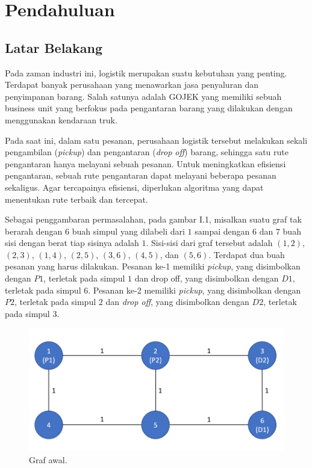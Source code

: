 \chapter{Pendahuluan}

\section{Latar Belakang}

Pada zaman industri ini, logistik merupakan suatu kebutuhan yang penting. Terdapat banyak perusahaan yang menawarkan jasa penyaluran dan penyimpanan barang.
Salah satunya adalah GOJEK yang memiliki sebuah business unit yang berfokus pada pengantaran barang yang dilakukan dengan menggunakan kendaraan truk.

Pada saat ini, dalam satu pesanan, perusahaan logistik tersebut melakukan sekali pengambilan (\textit{pickup}) dan pengantaran (\textit{drop off}) barang,
sehingga satu rute pengantaran hanya melayani sebuah pesanan. Untuk meningkatkan efisiensi pengantaran, sebuah rute pengantaran dapat melayani beberapa pesanan sekaligus.
Agar tercapainya efisiensi, diperlukan algoritma yang dapat menentukan rute terbaik dan tercepat.

Sebagai penggambaran permasalahan, pada gambar I.1, misalkan suatu graf tak berarah dengan $6$ buah simpul yang dilabeli dari $1$ sampai dengan $6$ dan $7$ 
buah sisi dengan berat tiap sisinya adalah $1$.
Sisi-sisi dari graf tersebut adalah $(1,2)$, $(2,3)$, $(1,4)$, $(2,5)$, $(3,6)$, $(4,5)$, dan $(5,6)$. Terdapat dua buah pesanan yang harus dilakukan. Pesanan ke-1 memiliki \textit{pickup},
yang disimbolkan dengan $P1$, terletak pada simpul $1$ dan drop off, yang disimbolkan dengan $D1$, terletak pada simpul $6$. Pesanan ke-2 memiliki \textit{pickup}, yang
disimbolkan dengan $P2$, terletak pada simpul $2$ dan \textit{drop off}, yang disimbolkan dengan $D2$, terletak pada simpul $3$.

\begin{figure}[H]
    \centering
    \includegraphics[width=1.0\textwidth]{resources/graph_init.png}
    \caption{Graf awal.}
\end{figure}


